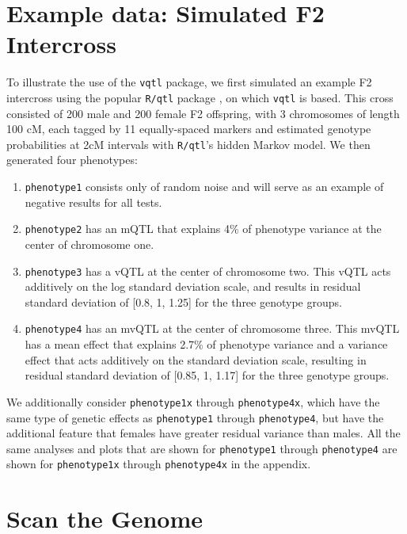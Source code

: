\documentclass[9pt,twocolumn,twoside]{gsag3jnl}
\begin{document}
\section*{Example data: Simulated F2 Intercross}

To illustrate the use of the \texttt{vqtl} package, we first simulated an example F2 intercross using the popular \texttt{R/qtl} package \citep{Broman2003}, on which \texttt{vqtl} is based.
This cross consisted of 200 male and 200 female F2 offspring, with 3 chromosomes of length 100 cM, each tagged by 11 equally-spaced markers and estimated genotype probabilities at 2cM intervals with \texttt{R/qtl}'s hidden Markov model. We then generated four phenotypes:
\begin{enumerate}
	\item \texttt{phenotype1} consists only of random noise and will serve as an example of negative results for all tests.
	\item \texttt{phenotype2} has an mQTL that explains 4\% of phenotype variance at the center of chromosome one.
	\item \texttt{phenotype3} has a vQTL at the center of chromosome two.
        This vQTL acts additively on the log standard deviation scale, and results in residual standard deviation of [0.8, 1, 1.25] for the three genotype groups.
	\item \texttt{phenotype4} has an mvQTL at the center of chromosome three.
        This mvQTL has a mean effect that explains 2.7\% of phenotype variance and a variance effect that acts additively on the standard deviation scale, resulting in residual standard deviation of [0.85, 1, 1.17] for the three genotype groups.
\end{enumerate}

We additionally consider \texttt{phenotype1x} through \texttt{phenotype4x}, which have the same type of genetic effects as \texttt{phenotype1} through \texttt{phenotype4}, but have the additional feature that females have greater residual variance than males.
All the same analyses and plots that are shown for \texttt{phenotype1} through \texttt{phenotype4} are shown for \texttt{phenotype1x} through \texttt{phenotype4x} in the appendix.

\section*{Scan the Genome}
\end{document}

